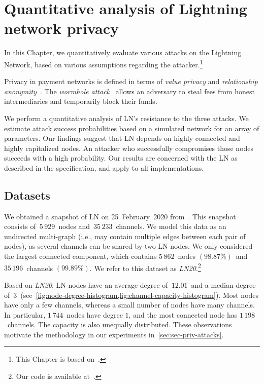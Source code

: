 \chapter{Quantitative analysis of Lightning network privacy}

\label{Chapter07LNattacks}

In this Chapter, we quantitatively evaluate various attacks on the Lightning Network, based on various assumptions regarding the attacker.\footnote{This Chapter is based on~\cite{Tikhomirov2020a}.}

Privacy in payment networks is defined in terms of \textit{value privacy} and \textit{relationship anonymity}~\cite{Malavolta2017}.
The \textit{wormhole attack}~\cite{Malavolta2019} allows an adversary to steal fees from honest intermediaries and temporarily block their funds.

We perform a quantitative analysis of LN's resistance to the three attacks.
We estimate attack success probabilities based on a simulated network for an array of parameters.
Our findings suggest that LN depends on highly connected and highly capitalized nodes.
An attacker who successfully compromises those nodes succeeds with a high probability.
Our results are concerned with the LN as described in the specification, and apply to all implementations.


\section{Datasets}
\label{sec:datasets}

We obtained a snapshot of LN on 25~February~2020 from~\cite{fiatjaf2020}.
This snapshot consists of~$5\,929$~nodes and~$35\,233$~channels.
We model this data as an undirected multi-graph (i.e., may contain multiple edges between each pair of nodes), as several channels can be shared by two LN nodes.
We only considered the largest connected component, which contains $5\,862$~nodes $(98.87\%)$~and~$35\,196$~channels $(99.89\%)$.
We refer to this dataset as \emph{LN20}.\footnote{Our code is available at~\cite{Tikhomirov2019}.}

Based on \emph{LN20}, 
LN nodes have an average degree of~$12.01$~and a median degree of~$3$~(see~\cref{fig:node-degree-histogram,fig:channel-capacity-histogram}).
Most nodes have only a few channels, whereas a small number of nodes have many channels.
In particular, $1\,744$~nodes have degree $1$, and the most connected node has $1\,198$~channels.
The capacity is also unequally distributed.
These observations motivate the methodology in our experiments in~\cref{sec:sec-priv-attacks}.

